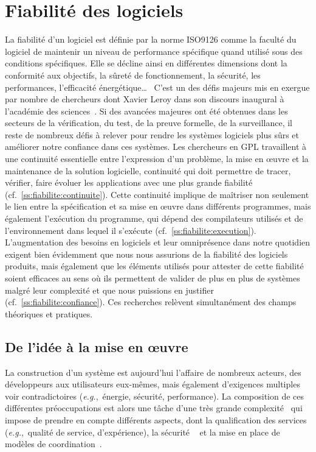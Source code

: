 \documentclass[11pt]{article}
\newcommand{\eg}[0]{\emph{e.g.},~}
\newcommand{\cf}[0]{cf.~}
\newcommand{\defi}[1]{\cite[défi]{#1}}
\begin{document}
\section{Fiabilité des logiciels\label{s:fiabilite}}
La fiabilité d'un logiciel est définie par la norme ISO9126 comme la faculté du logiciel de maintenir un niveau de performance spécifique quand utilisé sous des conditions spécifiques. Elle se décline ainsi en différentes dimensions dont la conformité aux objectifs, la sûreté de fonctionnement, la sécurité, les performances, l'efficacité énergétique\ldots~
C'est un des défis majeurs mis en exergue par nombre de chercheurs dont Xavier Leroy dans son discours inaugural à l'académie des sciences~\cite{leroy:hal-02370113}. Si des avancées majeures ont été obtenues dans les secteurs de la vérification, du test, de la preuve formelle, de la surveillance, il reste de nombreux défis à relever pour rendre les systèmes logiciels plus sûrs et améliorer notre confiance dans ces systèmes. 
Les chercheurs en GPL travaillent à une continuité essentielle entre l'expression d'un problème, la mise en {\oe}uvre et la maintenance de la solution logicielle, continuité qui doit permettre de tracer, vérifier, faire évoluer les applications avec une plus grande fiabilité (cf.~\ref{ss:fiabilite:continuite}). Cette continuité implique de maîtriser non seulement le lien entre la spécification et sa mise en  {\oe}uvre dans différents  programmes, mais également l'exécution du programme, qui dépend des compilateurs utilisés et de l'environnement dans lequel il s'exécute (\cf\ref{ss:fiabilite:execution}). 
L'augmentation des besoins en logiciels et leur omniprésence dans notre quotidien exigent bien évidemment que nous nous assurions de la fiabilité des logiciels produits, mais également que les éléments utilisés pour attester de cette fiabilité soient efficaces au sens où ils permettent de valider de plus en plus de systèmes malgré leur complexité et  que nous puissions en justifier (\cf\ref{ss:fiabilite:confiance}).
Ces recherches relèvent simultanément des champs théoriques et pratiques.


\subsection{De l'idée à la mise en {\oe}uvre\label{ss:fiabilite:continuite}} 
La construction d'un système est aujourd'hui l'affaire de nombreux acteurs, des développeurs aux utilisateurs eux-mêmes, mais également d'exigences multiples voir contradictoires (\eg énergie, sécurité, performance). La composition de ces différentes préoccupations est alors une tâche d'une très grande complexité~\defi{argumentation} qui impose de prendre en compte différents aspects, dont la qualification des services (\eg qualité de service, d'expérience), la sécurité
~\defi{securite} et la mise en place de modèles de coordination~\defi{reconfiguration}.
\end{document}
